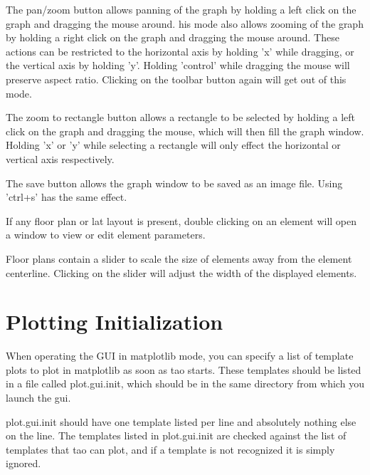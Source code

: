 The pan/zoom button allows panning of the graph by holding a left click on the graph and dragging the mouse around. his mode also allows zooming of the graph by holding a right click on the graph and dragging the mouse around. These actions can be restricted to the horizontal axis by holding 'x' while dragging, or the vertical axis by holding 'y'. Holding 'control' while dragging the mouse will preserve aspect ratio. Clicking on the toolbar button again will get out of this mode.

The zoom to rectangle button allows a rectangle to be selected by holding a left click on the graph and dragging the mouse, which will then fill the graph window. Holding 'x' or 'y' while selecting a rectangle will only effect the horizontal or vertical axis respectively.

The save button allows the graph window to be saved as an image file. Using 'ctrl+s' has the same effect.

If any floor plan or lat layout is present, double clicking on an element will open a window to view or edit element parameters.

Floor plans contain a slider to scale the size of elements away from the element centerline. Clicking on the slider will adjust the width of the displayed elements.

\section{Plotting Initialization}
\label{s:gui.plot.init}

When operating the GUI in matplotlib mode, you can specify a list of template plots to plot in matplotlib as soon as tao starts.  These templates should be listed in a file called plot.gui.init, which should be in the same directory from which you launch the gui.

plot.gui.init should have one template listed per line and absolutely nothing else on the line.  The templates listed in plot.gui.init are checked against the list of templates that tao can plot, and if a template is not recognized it is simply ignored.

